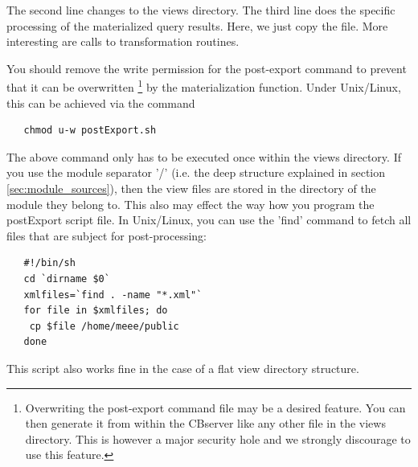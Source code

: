 The second line changes to the views directory. The third line does the 
specific processing of the materialized query results. Here, we just copy the
file. More interesting are calls to transformation routines. 

You should remove the write permission for the post-export command to prevent that
it can be overwritten%
\footnote{Overwriting the post-export command file may be a desired feature. You can then
generate it from within the CBserver like any other file in the views directory. 
This is however a major security hole and we strongly discourage to use this feature.}
by the materialization function. Under Unix/Linux, this can be achieved via the command

\begin{verbatim}
   chmod u-w postExport.sh
\end{verbatim}

The above command only has to be executed once within the views directory.
If you use the module separator '/' (i.e. the deep structure explained in section \ref{sec:module_sources}),
then the view files are stored in the directory of the module they belong to.
This also may effect the way how you program the postExport script file. In Unix/Linux,
you can use the 'find' command to fetch all files that are subject for post-processing:

\begin{verbatim}
   #!/bin/sh
   cd `dirname $0`
   xmlfiles=`find . -name "*.xml"`
   for file in $xmlfiles; do
    cp $file /home/meee/public
   done
\end{verbatim}

This script also works fine in the case of a flat view directory structure.


